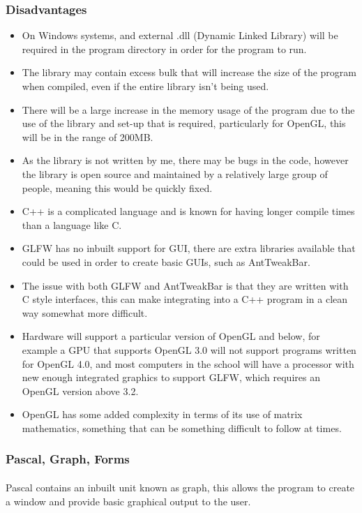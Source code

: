 \subsubsection*{Disadvantages}
\begin{itemize}
\item On Windows systems, and external .dll (Dynamic Linked Library) will be required in the program directory in order for the program to run.
\item The library may contain excess bulk that will increase the size of the program when compiled, even if the entire library isn’t being used.
\item There will be a large increase in the memory usage of the program due to the use of the library and set-up that is required, particularly for OpenGL, this will be in the range of 200MB.
\item As the library is not written by me, there may be bugs in the code, however the library is open source and maintained by a relatively large group of people, meaning this would be quickly fixed.
\item C++ is a complicated language and is known for having longer compile times than a language like C.
\item GLFW has no inbuilt support for GUI, there are extra libraries available that could be used in order to create basic GUIs, such as AntTweakBar.
\item The issue with both GLFW and AntTweakBar is that they are written with C style interfaces, this can make integrating into a C++ program in a clean way somewhat more difficult.
\item Hardware will support a particular version of OpenGL and below, for example a GPU that supports OpenGL 3.0 will not support programs written for OpenGL 4.0, and most computers in the school will have a processor with new enough integrated graphics to support GLFW, which requires an OpenGL version above 3.2.
\item OpenGL has some added complexity in terms of its use of matrix mathematics, something that can be something difficult to follow at times.
\end{itemize}

\pagebreak
\subsubsection{Pascal, Graph, Forms}
\paragraph{}
Pascal contains an inbuilt unit known as graph, this allows the program to create a window and provide basic graphical output to the user.
